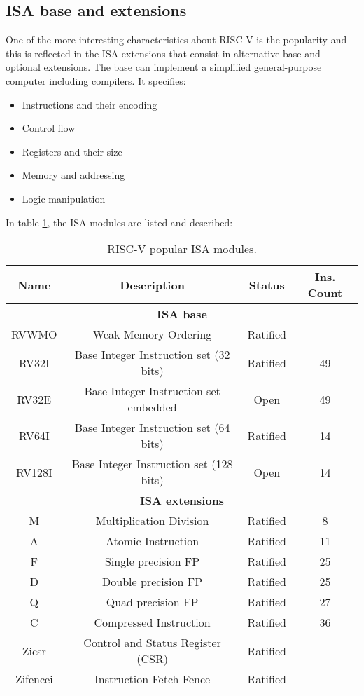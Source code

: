 \subsection{ISA base and extensions} 
One of the more interesting characteristics about RISC-V is the popularity and this is reflected in the ISA extensions that consist in alternative base and optional extensions. The base can implement a simplified general-purpose computer including compilers. It specifies: 

\begin{itemize}
	\item Instructions and their encoding
	\item Control flow
	\item Registers and their size
	\item Memory and addressing
	\item Logic manipulation
\end{itemize}

In table \ref{tab:isa}, the ISA modules are listed and described:

\begin{table}[H]
\centering
\begin{tabular}{|c|c|c|c|}
\hline
\textbf{Name} & \textbf{Description} & \textbf{Status}  & \textbf{Ins. Count}  \\ \hline

\multicolumn{4}{|c|}{\textbf{ISA base}} \\ \hline
RVWMO & Weak Memory Ordering & Ratified & \\ \hline
RV32I & Base Integer Instruction set (32 bits) & Ratified & 49 \\ \hline
RV32E & Base Integer Instruction set embedded & Open & 49 \\ \hline
RV64I & Base Integer Instruction set (64 bits) & Ratified & 14 \\ \hline
RV128I & Base Integer Instruction set (128 bits) & Open & 14 \\ \hline

\multicolumn{4}{|c|}{\textbf{ISA extensions}} \\ \hline

M & Multiplication Division & Ratified & 8\\ \hline
A & Atomic Instruction & Ratified & 11 \\ \hline
F & Single precision FP & Ratified & 25 \\ \hline
D & Double precision FP & Ratified & 25 \\ \hline
Q & Quad precision FP & Ratified & 27 \\ \hline
C & Compressed Instruction & Ratified & 36 \\ \hline
Zicsr & Control and Status Register (CSR) & Ratified &  \\ \hline
Zifencei & Instruction-Fetch Fence & Ratified & \\ \hline
\end{tabular}
\caption{RISC-V popular ISA modules.} 
\label{tab:isa}
\end{table}

